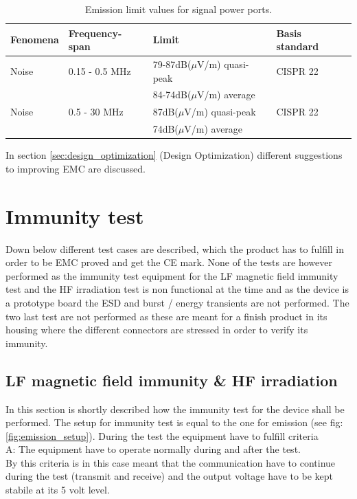 \begin{table}[H]
		\begin{center}
		\begin{tabular}{|l|l|l|l|}\hline
			Fenomena 	& Frequency-span & Limit & Basis standard\\\hline
			Noise		& 0.15 - 0.5 MHz		& 79-87dB($\mu$V/m) quasi-peak	& CISPR 22	\\
			~ 			& ~					& 84-74dB($\mu$V/m) average	& ~		\\\hline
			Noise		& 0.5 - 30 MHz			& 87dB($\mu$V/m) quasi-peak		& CISPR 22	\\
			~ 			& ~					& 74dB($\mu$V/m) average		& 		\\\hline
		\end{tabular}
		\end{center}
	\caption{Emission limit  values for signal power ports.}
	\label{table:emission_standard_SIGNAL}
\end{table}

In section \ref{sec:design_optimization} (Design Optimization) different suggestions to improving EMC are discussed.

\section{Immunity test}
Down below different test cases are described, which the product has to fulfill in order to be EMC proved and get the CE mark. None of the tests are however performed as the immunity test equipment for the LF magnetic field immunity test and the HF irradiation test is non functional at the time and as the device is a prototype board the ESD and burst / energy transients are not performed. The two last test are not performed as these are meant for a finish product in its housing where the different connectors are stressed in order to verify its immunity. 

\subsection{LF magnetic field immunity \& HF irradiation}
In this section is shortly described how the immunity test for the device shall be performed.
\p The setup for immunity test is equal to the one for emission (see fig: \ref{fig:emission_setup}). During the test the equipment have to fulfill criteria \\A: The equipment have to operate normally during and after the test. \\ By this criteria is in this case meant that the communication have to continue during the test (transmit and receive) and the output voltage have to be kept stabile at its 5 volt level.

